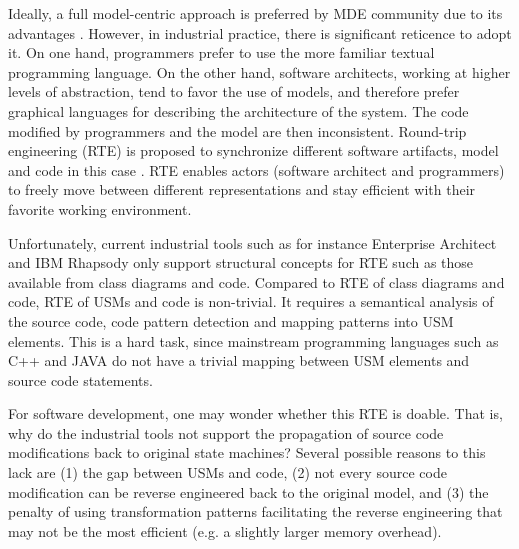 Ideally, a full model-centric approach is preferred by MDE community due to its advantages \cite{Selic2012}. However, in industrial practice, there is significant reticence \cite{Hutchinson:2011:MEP:1985793.1985882} to adopt it.
On one hand, programmers prefer to
use the more familiar textual programming language. 
On the other hand, software architects, working at higher levels
of abstraction, tend to favor the use of models, and therefore
prefer graphical languages for describing the architecture of
the system.
The code modified by programmers and the model are then inconsistent. Round-trip engineering (RTE) \cite{Hettel2008} is proposed to synchronize different software artifacts, model and code in this case \cite{Sendall}. RTE enables actors (software architect and programmers) to freely move between different representations \cite{Sendall} and stay efficient with their favorite working environment. 

Unfortunately, current industrial tools such as for instance Enterprise Architect \cite{sparxsystems_enterprise_2014} and IBM Rhapsody\cite{ibm_rhapsody} only support structural concepts for RTE such as those available from class diagrams and code. Compared to RTE of class diagrams and code, RTE of USMs and code is non-trivial. It requires a semantical analysis of the source code, code pattern detection and mapping patterns into USM elements. 
This is a hard task, since mainstream programming languages such as C++ and JAVA do not have a trivial mapping between USM elements and source code statements.

For software development, one may wonder whether this RTE is doable. That is, why do the industrial tools not support the propagation of source code modifications back to original state machines? Several possible reasons to this lack are (1) the gap between USMs and code, (2) not every source code modification can be reverse engineered back to the original model, and (3) the penalty of using transformation patterns facilitating the reverse engineering that may not be the most efficient (e.g. a slightly larger memory overhead). 
 
